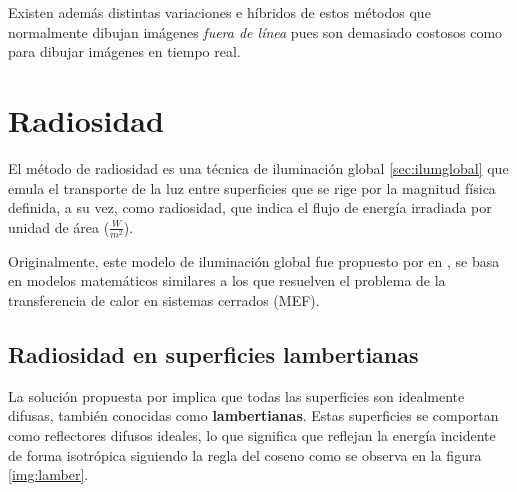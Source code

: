 Existen además distintas variaciones e híbridos de estos métodos que normalmente dibujan imágenes \textit{fuera de línea} pues son demasiado costosos como para dibujar imágenes en tiempo real.

\section{Radiosidad}
\label{sec:radiosidad}

El método de radiosidad es una técnica de iluminación global \ref{sec:ilumglobal} que emula el transporte de la luz entre superficies que se rige por la magnitud física definida, a su vez, como radiosidad, que indica el flujo de energía irradiada por unidad de área ($\frac{W}{m^{2}}$).

Originalmente, este modelo de iluminación global fue propuesto por \citeauthor{Goral} en \citeyear{Goral}, se basa en modelos matemáticos similares a los que resuelven el problema de la transferencia de calor en sistemas cerrados (MEF).

\subsection{Radiosidad en superficies lambertianas}

La solución propuesta por \citeauthor{Goral} implica que todas las superficies son idealmente difusas, también conocidas como \textbf{lambertianas}. Estas superficies se comportan como reflectores difusos ideales, lo que significa que reflejan la energía incidente de forma isotrópica siguiendo la regla del coseno como se observa en la figura \ref{img:lamber}.

